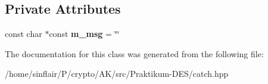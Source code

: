 \subsection*{Private Attributes}
\begin{DoxyCompactItemize}
\item 
\mbox{\label{classCatch_1_1GeneratorException_a493b6ec9e3be0e3852de73c87dba6e5e}} 
const char $\ast$const {\bfseries m\+\_\+msg} = \char`\"{}\char`\"{}
\end{DoxyCompactItemize}


The documentation for this class was generated from the following file\+:\begin{DoxyCompactItemize}
\item 
/home/sinflair/\+P/crypto/\+A\+K/src/\+Praktikum-\/\+D\+E\+S/catch.\+hpp\end{DoxyCompactItemize}
